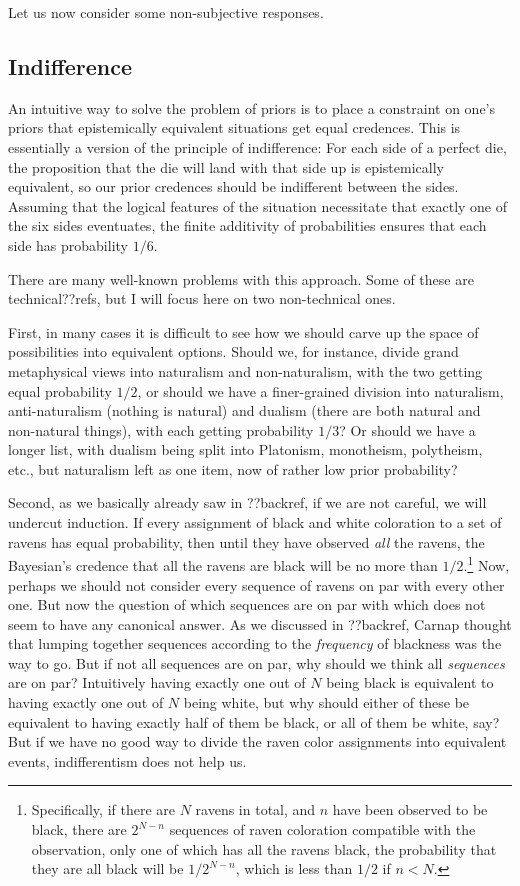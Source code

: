 Let us now consider some non-subjective responses.

\subsection{Indifference}
An intuitive way to solve the problem of priors is to place a constraint on one's priors that 
epistemically equivalent situations get equal credences. This is essentially a version of the 
principle of indifference: For each side of a perfect die, the proposition that the die will land 
with that side up is epistemically equivalent, so our prior credences should be indifferent between
the sides. Assuming that the logical features of the situation necessitate that exactly one of the six 
sides eventuates, the finite additivity of probabilities ensures that each side has probability $1/6$.

There are many well-known problems with this approach. Some of these are technical??refs, but I will
focus here on two non-technical ones.

First, in many cases it is
difficult to see how we should carve up the space of possibilities into equivalent options. Should we,
for instance, divide grand metaphysical views  into naturalism and non-naturalism, with the two getting
equal probability $1/2$, or should we have a finer-grained division into naturalism, anti-naturalism
(nothing is natural) and dualism (there are both natural and non-natural things), with each getting 
probability $1/3$? Or should we have a longer list, with dualism being split into Platonism, monotheism,
polytheism, etc., but naturalism left as one item, now of rather low prior probability? 

Second, as we basically already saw in ??backref, if we are not careful, we will undercut induction.
If every assignment of black and white coloration to a set of ravens has equal probability, then until
they have observed \textit{all} the ravens, the Bayesian's credence that all the ravens are black will
be no more than $1/2$.\footnote{Specifically, if there are $N$ ravens in total, and $n$ have been observed 
to be black, there are $2^{N-n}$ sequences of raven coloration compatible with the observation, only
one of which has all the ravens black, the probability that they are all black will be $1/2^{N-n}$, which
is less than $1/2$ if $n<N$.} Now, perhaps we should not consider every sequence of ravens on par with 
every other one. But now the question of which sequences are on par with which does not seem to have any
canonical answer. As we discussed in ??backref, Carnap thought that lumping together sequences 
according to the \textit{frequency} of blackness was the way to go. But if not all sequences are on par,
why should we think all \textit{sequences} are on par? Intuitively having exactly one out of $N$ being black 
is equivalent to having exactly one out of $N$ being white, but why should either of these be equivalent 
to having exactly half of them be black, or all of them be white, say? But if we have no good way to 
divide the raven color assignments into equivalent events, indifferentism does not help us.

